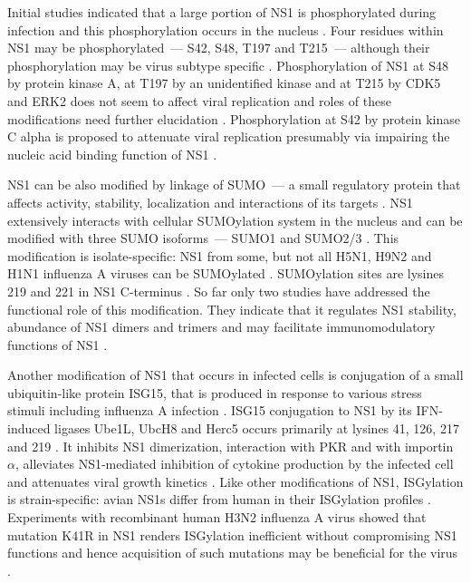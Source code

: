 		Initial studies indicated that a large portion of \gls{NS1} is phosphorylated during infection and this phosphorylation occurs in the nucleus \parencite{Privalsky1981}. Four residues within \gls{NS1} may be phosphorylated~--- S42, S48, T197 and T215~--- although their phosphorylation may be virus subtype specific \parencite{Petri1982}. Phosphorylation of \gls{NS1} at S48 by protein kinase A, at T197 by an unidentified kinase and at T215 by \gls{CDK5} and \gls{ERK2} does not seem to affect viral replication and roles of these modifications need further elucidation \parencite{Hale2009, Hutchinson2012, Hsiang2012}. Phosphorylation at S42 by protein kinase C alpha is proposed to attenuate viral replication presumably via impairing the nucleic acid binding function of \gls{NS1} \parencite{Hsiang2012}.
		
		\gls{NS1} can be also modified by linkage of \gls{SUMO}~--- a small regulatory protein that affects activity, stability, localization and interactions of its targets \parencite{Johnson2004, Pal2010a}. \gls{NS1} extensively interacts with cellular \gls{SUMO}ylation system in the nucleus and can be modified with three \gls{SUMO} isoforms~--- \gls{SUMO}1 and \gls{SUMO}2/3 \parencite{Pal2011, Santos2013a}. This modification is isolate-specific: \gls{NS1} from some, but not all H5N1, H9N2 and H1N1 influenza A viruses can be \gls{SUMO}ylated \parencite{Xu2011}. \gls{SUMO}ylation sites are lysines 219 and 221 in NS1 C-terminus \parencite{Xu2011}. So far only two studies have addressed the functional role of this modification. They indicate that it regulates \gls{NS1} stability, abundance of \gls{NS1} dimers and trimers and may facilitate immunomodulatory functions of \gls{NS1} \parencite{Xu2011, Santos2013a}. 
		
		Another modification of \gls{NS1} that occurs in infected cells is conjugation of a small ubiquitin-like protein \gls{ISG15}, that is produced in response to various stress stimuli including influenza A infection \parencite{Pitha-Rowe2007, Sadler2008, Hsiang2009}. \gls{ISG15} conjugation to \gls{NS1} by its \gls{IFN}-induced ligases Ube1L, UbcH8 and Herc5 occurs primarily at lysines 41, 126, 217 and 219 \parencite{Zhao2010, Tang2010a}. It inhibits \gls{NS1} dimerization, interaction with \gls{PKR} and with importin $\alpha$, alleviates \gls{NS1}-mediated inhibition of cytokine production by the infected cell and attenuates viral growth kinetics \parencite{Zhao2010, Tang2010a}. Like other modifications of \gls{NS1}, ISGylation is strain-specific: avian \gls{NS1}s differ from human in their ISGylation profiles \parencite{Tang2010a}. Experiments with recombinant human H3N2 influenza A virus showed that mutation K41R in NS1 renders ISGylation inefficient without compromising \gls{NS1} functions and hence acquisition of such mutations may be beneficial for the virus \parencite{Zhao2010}.
	
